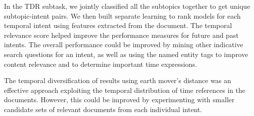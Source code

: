 \documentclass{sig-alternate}
\begin{document}
In the TDR subtask, we jointly classified all the subtopics together to get unique subtopic-intent pairs. We then built separate learning to rank models for each temporal intent using features extracted from the document. The temporal relevance score helped improve the performance measures for future and past intents. The overall performance could be improved by mining other indicative search questions for an intent, as well as using the named entity tags to improve content relevance and to determine important time expressions.

The temporal diversification of results using earth mover's distance was an effective approach exploiting the temporal distribution of time references in the documents. However, this could be improved by experimenting with smaller candidate sets of relevant documents from each individual intent.



\end{document}
